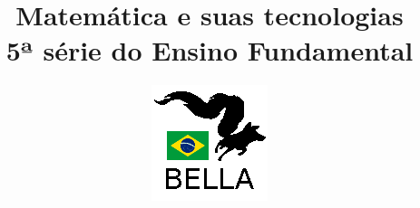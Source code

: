 \documentclass{book}
\begin{document}
\title{Matemática e suas tecnologias \\
5ª série do Ensino Fundamental}
\author{\includegraphics{../../logos/128x128-brazil.png}}

\maketitle

\tableofcontents







\end{document}
